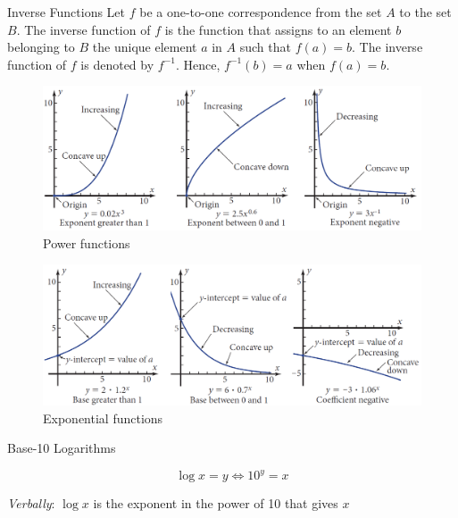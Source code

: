 \begin{definition}{Inverse Functions}
Let $f$ be a one-to-one correspondence from the set $A$ to the set $B$. The inverse function of $f$ is the function that assigns to an element $b$ belonging to $B$ the unique element $a$ in $A$ such that $f(a)=b$. The inverse function of $f$ is denoted by $f^{-1}$. Hence, $f^{-1}(b)=a$ when $f(a)=b$.    
\end{definition}

\begin{figure}[htbp]
    \centering
    \includegraphics[width=1\textwidth]{figure/book3.png} %
    \caption{Power functions}
\end{figure}

\begin{figure}[htbp]
    \centering
    \includegraphics[width=1\textwidth]{figure/book4.png} %
    \caption{Exponential functions}
\end{figure}

\begin{definition}{Base-10 Logarithms}

\[
\log x=y \iff 10^y=x
\]

\textit{Verbally}: $\log x$ is the exponent in the power of 10 that gives $x$   
\end{definition}


